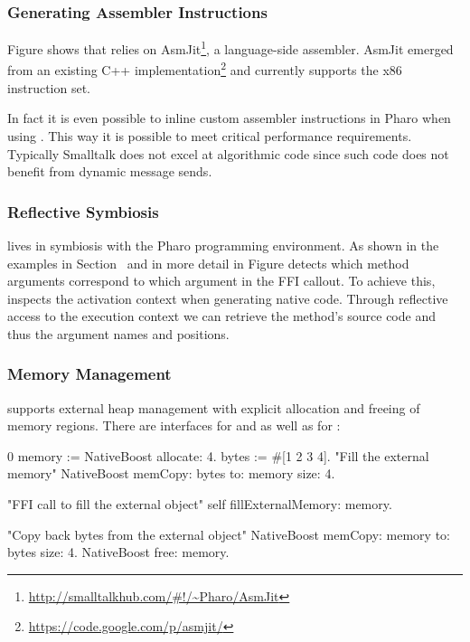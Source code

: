 \subsubsection{Generating Assembler Instructions}

Figure  shows that \NB relies on AsmJit\footnote{\url{http://smalltalkhub.com/\#!/~Pharo/AsmJit}}, a language-side assembler.
AsmJit emerged from an existing C++ implementation\footnote{\url{https://code.google.com/p/asmjit/}} and currently supports the x86 instruction set.

In fact it is even possible to inline custom assembler instructions in Pharo when using \NB.
This way it is possible to meet critical performance requirements.
Typically Smalltalk does not excel at algorithmic code since such code does not benefit from dynamic message sends.

\subsubsection{Reflective Symbiosis}

\NB lives in symbiosis with the Pharo programming environment.
As shown in the examples in Section~ and in more detail in Figure  \NB detects which method arguments correspond to which argument in the FFI callout.
To achieve this, \NB inspects the activation context when generating native code.
Through reflective access to the execution context we can retrieve the method's source code and thus the argument names and positions.

\subsubsection{Memory Management}

\NB supports external heap management with explicit allocation and freeing of memory regions.
There are interfaces for  and  as well as for :
%
\begin{stcode}[
	label={lst:externalHeap},
	caption={Example of external heap management in \NB}]{0}
memory := NativeBoost allocate: 4.
bytes  := #[1 2 3 4].
"Fill the external memory"
NativeBoost memCopy: bytes to: memory size: 4.

"FFI call to fill the external object"
self fillExternalMemory: memory.

"Copy back bytes from the external object"
NativeBoost memCopy: memory to: bytes size: 4.
NativeBoost free: memory.
\end{stcode}

